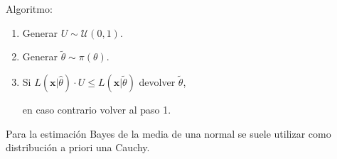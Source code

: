 \documentclass[
]{book}
\theoremstyle{break}
\theoremstyle{definition}
\theoremstyle{definition}
\theoremstyle{definition}
\theoremstyle{remark}
\let\BeginKnitrBlock\begin \let\EndKnitrBlock\end
\begin{document}
Algoritmo:

\begin{enumerate}
\def\labelenumi{\arabic{enumi}.}
\item
  Generar \(U\sim \mathcal{U}\left( 0,1\right)\).
\item
  Generar \(\tilde{\theta}\sim \pi (\theta )\).
\item
  Si \(L(\mathbf{x}|\hat{\theta})\cdot U \leq L(\mathbf{x}|\tilde{\theta})\) devolver \(\tilde{\theta}\),

  en caso contrario volver al paso 1.
\end{enumerate}

\BeginKnitrBlock{exercise}
\protect\hypertarget{exr:unnamed-chunk-13}{}{\label{exr:unnamed-chunk-13} }
\EndKnitrBlock{exercise}

Para la estimación Bayes de la media de una normal se suele utilizar
como distribución a priori una Cauchy.
\end{document}
